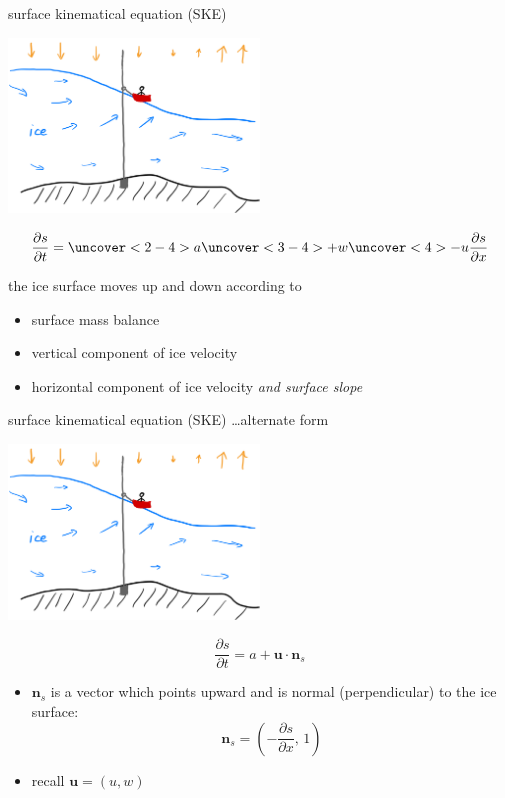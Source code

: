\documentclass[10pt,dvipsnames]{beamer}
\newcommand{\bn}{\mathbf{n}}
\newcommand{\bu}{\mathbf{u}}
\begin{document}
\begin{frame}{surface kinematical equation (SKE)}
\begin{center}
\includegraphics[width=0.5\textwidth]{boatplus}
\end{center}

\vspace{-5mm}
\begin{equation*}
\frac{\partial s}{\partial t} = \uncover<2-4>{a} \uncover<3-4>{+w} \uncover<4>{-u \frac{\partial s}{\partial x}}
\end{equation*}

the ice surface moves up and down according to
\begin{itemize}
\item<2-4> surface mass balance
\item<3-4> vertical component of ice velocity
\item<4> horizontal component of ice velocity \emph{and surface slope}
\end{itemize}
\end{frame}

\begin{frame}{surface kinematical equation (SKE) \dots alternate form}
\begin{center}
\includegraphics[width=0.5\textwidth]{boatplus}
\end{center}

\vspace{-5mm}
\begin{equation*}
\frac{\partial s}{\partial t} = a + \bu \cdot \bn_s
\end{equation*}

\begin{itemize}
\item $\bn_s$ is a vector which points upward and is normal (perpendicular) to the ice surface:
	$$\bn_s = \left(-\frac{\partial s}{\partial x}, \,1\right)$$
\item recall $\bu=(u,w)$
\end{itemize}
\end{frame}
\end{document}
